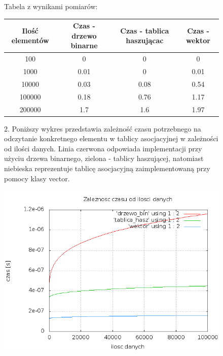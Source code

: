 \documentclass[a4paper,11pt]{report}
\begin{document}
\begin{figure}
  \begin{center}
  Tabela z wynikami pomiarów:\\
  \begin{tabular}{|c|c|c|c|}
  \hline 
  Ilość elementów & Czas - drzewo binarne & Czas - tablica haszującac & Czas - wektor\\
  \hline
  100 & 0 & 0 & 0\\
  \hline
  1000	&	0.01 & 0 & 0.01\\
  \hline
  10000	&	0.03 & 0.08 & 0.54 \\
  \hline
  100000 &	0.18 & 0.76 & 1.17\\
  \hline
  200000 &	1.7 & 1.6 & 1.97\\
  \hline
\end{tabular} 
\end{center}
\end{figure}
\begin{figure}
  2. Poniższy wykres przedstawia zależność czasu potrzebnego na odczytanie konkretnego elementu w tablicy asocjacyjnej w zależności od ilości danych. Linia czerwona odpowiada implementacji przy użyciu drzewa binarnego, zielona - tablicy haszującej, natomiast niebieska reprezentuje tablicę asocjacyjną zaimplementowaną przy pomocy klasy vector.
  \\\begin{center} \includegraphics[scale=0.50]{./razem2.png}\end{center}
\end{figure}
\end{document}

